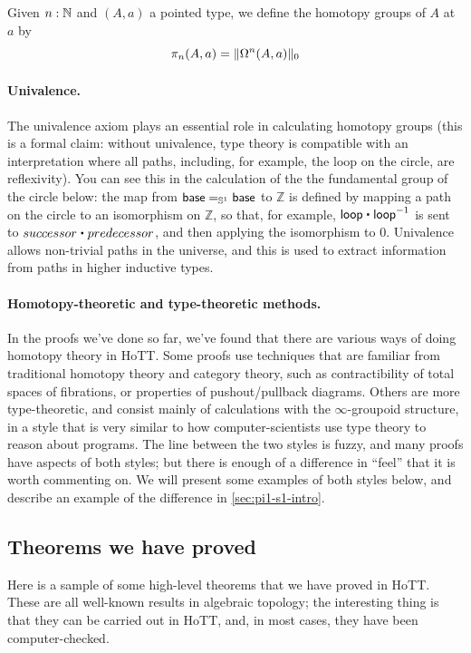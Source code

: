 \begin{defn}
  Given $n:\N$ and $(A,a)$ a pointed type, we define the homotopy groups of $A$
  at $a$ by
  \[\pi_n(A,a)=\trunc0{\Omega^n(A,a)}\]
\end{defn}

\paragraph{Univalence.}  The univalence axiom plays an essential role in
  calculating homotopy groups (this is a formal claim: without
  univalence, type theory is compatible with an interpretation where all
  paths, including, for example, the loop on the circle, are reflexivity).  You
  can see this in the calculation of the the fundamental group of the
  circle below: the map from $\id[\Sn ^1] \base \base$ to $\mathbb{Z}$
  is defined by mapping a path on the circle to an isomorphism on
  $\mathbb{Z}$, so that, for example, $\lloop \ct \opp \lloop$ is sent
  to $successor \ct predecessor$, and then applying the isomorphism to
  0. Univalence allows non-trivial paths in the universe, and this is
  used to extract information from paths in higher inductive types.

\paragraph{Homotopy-theoretic and type-theoretic methods.}  In the
proofs we've done so far, we've found that there are various ways of
doing homotopy theory in HoTT.  Some proofs use techniques that are
familiar from traditional homotopy theory and category theory, such as
contractibility of total spaces of fibrations, or properties of
pushout/pullback diagrams.  Others are more type-theoretic, and consist
mainly of calculations with the $\infty$-groupoid structure, in a style
that is very similar to how computer-scientists use type theory to
reason about programs.  The line between the two styles is fuzzy, and
many proofs have aspects of both styles; but there is enough of a
difference in ``feel'' that it is worth commenting on.  We will present
some examples of both styles below, and describe an example of the
difference in \autoref{sec:pi1-s1-intro}.

\subsection{Theorems we have proved}

Here is a sample of some high-level theorems that we have proved in
HoTT.  These are all well-known results in algebraic topology; the
interesting thing is that they can be carried out in HoTT, and, in most
cases, they have been computer-checked.

